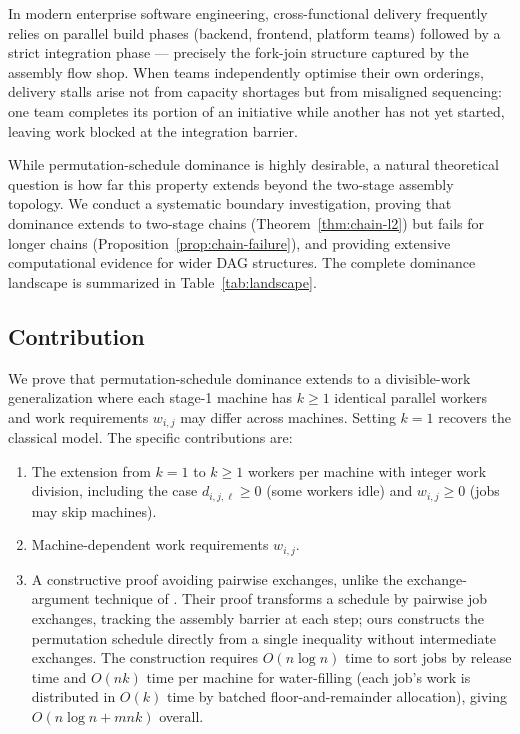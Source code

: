 \documentclass[11pt,titlepage]{article}
\begin{document}
In modern enterprise software engineering, cross-functional delivery
frequently relies on parallel build phases (backend, frontend, platform
teams) followed by a strict integration phase --- precisely the
fork-join structure captured by the assembly flow shop.  When teams
independently optimise their own orderings, delivery stalls arise not
from capacity shortages but from misaligned sequencing: one team
completes its portion of an initiative while another has not yet
started, leaving work blocked at the integration barrier.

While permutation-schedule dominance is highly desirable, a natural
theoretical question is how far this property extends beyond the
two-stage assembly topology. We conduct a systematic boundary
investigation, proving that dominance extends to two-stage chains
(Theorem~\ref{thm:chain-l2}) but fails for longer chains
(Proposition~\ref{prop:chain-failure}), and providing extensive
computational evidence for wider DAG structures. The complete
dominance landscape is summarized in Table~\ref{tab:landscape}.

\subsection{Contribution}

We prove that permutation-schedule dominance extends to a
divisible-work generalization where each stage-1 machine has
$k \geq 1$ identical parallel workers and work requirements
$w_{i,j}$ may differ across machines. Setting $k = 1$ recovers
the classical model. The specific contributions are:
\begin{enumerate}
  \item The extension from $k = 1$ to $k \geq 1$ workers per
        machine with integer work division, including the case
        $d_{i,j,\ell} \geq 0$ (some workers idle) and
        $w_{i,j} \geq 0$ (jobs may skip machines).
  \item Machine-dependent work requirements $w_{i,j}$.
  \item A constructive proof avoiding pairwise exchanges,
        unlike the exchange-argument technique of
        \textcite{potts1995}. Their proof transforms a schedule
        by pairwise job exchanges, tracking the assembly barrier
        at each step; ours constructs the permutation schedule
        directly from a single inequality without intermediate
        exchanges. The construction requires $O(n \log n)$
        time to sort jobs by release time and $O(nk)$ time
        per machine for water-filling (each job's work is
        distributed in $O(k)$ time by batched
        floor-and-remainder allocation), giving
        $O(n \log n + mnk)$ overall.
\end{enumerate}
\end{document}
